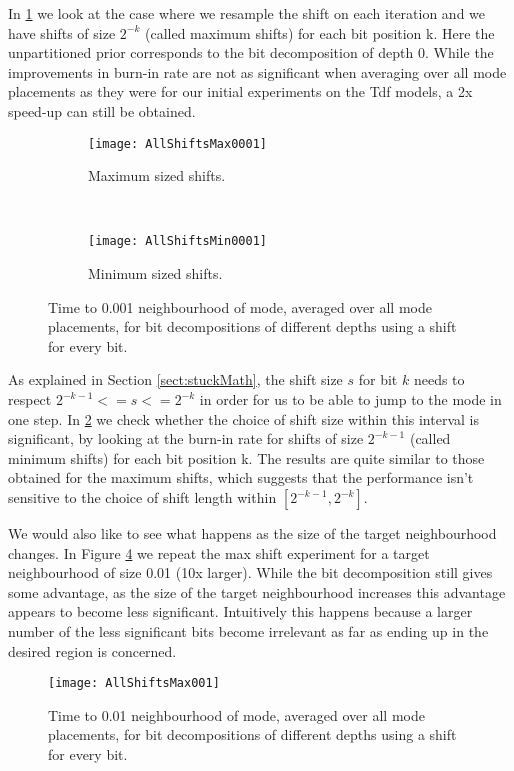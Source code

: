 In \ref{fig:allMaxShifts} we look at the case where we resample the shift on each iteration and we have shifts of size $2^{-k}$ (called maximum shifts) for each bit position k. Here the unpartitioned prior corresponds to the bit decomposition of depth 0. While the improvements in burn-in rate are not as significant when averaging over all mode placements as they were for our initial experiments on the Tdf models, a 2x speed-up can still be obtained.

\begin{figure}[h]
    \centering
    \begin{subfigure}[t]{0.48\textwidth}
      \texttt{[image: AllShiftsMax0001]}
      \caption{Maximum sized shifts.}
      \label{fig:allMaxShifts}
    \end{subfigure}
    ~
    \begin{subfigure}[t]{0.48\textwidth}
      \texttt{[image: AllShiftsMin0001]}
      \caption{Minimum sized shifts.}
      \label{fig:allMinShifts}
    \end{subfigure}
    \caption{Time to 0.001 neighbourhood of mode, averaged over all mode placements, for bit decompositions of different depths using a shift for every bit.}
    \label{fig:allShifts}
\end{figure}


As explained in Section \ref{sect:stuckMath}, the shift size $s$ for bit $k$ needs to respect $2^{-k-1} <= s <= 2^{-k}$ in order for us to be able to jump to the mode in one step. In \ref{fig:allMinShifts} we check whether the choice of shift size within this interval is significant, by looking at the burn-in rate for shifts of size $2^{-k-1}$ (called minimum shifts) for each bit position k. The results are quite similar to those obtained for the maximum shifts, which suggests that the performance isn't sensitive to the choice of shift length within $[2^{-k-1}, 2^{-k}]$.

We would also like to see what happens as the size of the target neighbourhood changes. In Figure \ref{fig:AllShiftsMax001} we repeat the max shift experiment for a target neighbourhood of size 0.01 (10x larger). While the bit decomposition still gives some advantage, as the size of the target neighbourhood increases this advantage appears to become less significant. Intuitively this happens because a larger number of the less significant bits become irrelevant as far as ending up in the desired region is concerned.

\begin{figure}[h]
    \centering
    \texttt{[image: AllShiftsMax001]}
    \caption{Time to 0.01 neighbourhood of mode, averaged over all mode placements, for bit decompositions of different depths using a shift for every bit.}
    \label{fig:AllShiftsMax001}
\end{figure}

